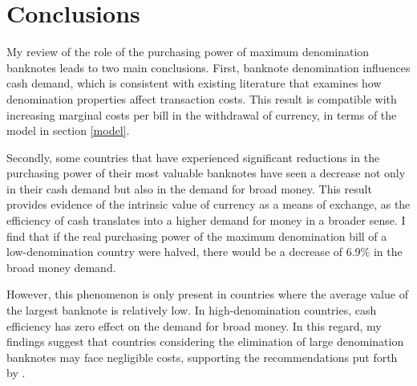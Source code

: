 \documentclass[12pt]{article}
\begin{document}
\section{Conclusions}

My review of the role of the purchasing power of maximum denomination banknotes leads to two main conclusions. First, banknote denomination influences cash demand, which is consistent with existing literature that examines how denomination properties affect transaction costs. This result is compatible with increasing marginal costs per bill in the withdrawal of currency, in terms of the model in section \ref{model}.

Secondly, some countries that have experienced significant reductions in the purchasing power of their most valuable banknotes have seen a decrease not only in their cash demand but also in the demand for broad money. This result provides evidence of the intrinsic value of currency as a means of exchange, as the efficiency of cash translates into a higher demand for money in a broader sense. I find that if the real purchasing power of the maximum denomination bill of a low-denomination country were halved, there would be a decrease of 6.9\% in the broad money demand.

However, this phenomenon is only present in countries where the average value of the largest banknote is relatively low. In high-denomination countries, cash efficiency has zero effect on the demand for broad money. In this regard, my findings suggest that countries considering the elimination of large denomination banknotes may face negligible costs, supporting the recommendations put forth by \cite{rogoff2016}.

\begin{landscape}
    
\end{landscape}

\begin{landscape}
    
\end{landscape}


\end{document}
